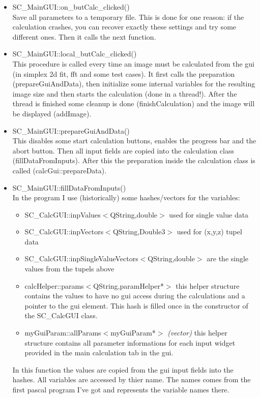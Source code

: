\documentclass[11pt]{article} %
\begin{document}
\begin{itemize}
\item SC\_MainGUI::on\_butCalc\_clicked() \\
	Save all parameters to a temporary file. This is done for one reason: if the calculation crashes, you can recover exactly these settings and try some different ones. Then it calls the next function.

\item SC\_MainGUI::local\_butCalc\_clicked() \\
	This procedure is called every time an image must be calculated from the gui (in simplex 2d fit, fft and some test cases). It first calls the preparation (prepareGuiAndData), then initialize some internal variables for the resulting image size and then starts the calculation (done in a thread!). After the thread is finished some cleanup is done (finishCalculation) and the image will be displayed (addImage).

\item SC\_MainGUI::prepareGuiAndData() \\
	This disables some start calculation buttons, enables the progress bar and the abort button. Then all input fields are copied into the calculation class (fillDataFromInputs). After this the preparation inside the calculation class is called (calcGui::prepareData).

\item SC\_MainGUI::fillDataFromInputs() \\
	In the program I use (historically) some hashes/vectors for the variables:
	\begin{itemize}\itemsep0pt
	\item SC\_CalcGUI::inpValues$<$QString,double$>$ used for single value data
	\item SC\_CalcGUI::inpVectors$<$QString,Double3$>$ used for (x,y,z) tupel data
	\item SC\_CalcGUI::inpSingleValueVectors$<$QString,double$>$ are the single values from the tupels above
	\item calcHelper::params$<$QString,paramHelper*$>$ this helper structure contains the values to have no gui access during the calculations and a pointer to the gui element. This hash is filled once in the constructor of the SC\_CalcGUI class.
	\item myGuiParam::allParams$<$myGuiParam*$>$ {\it (vector)} this helper structure contains all parameter informations for each input widget provided in the main calculation tab in the gui.
	\end{itemize}
In this function the values are copied from the gui input fields into the hashes. All variables are accessed by thier name. The names comes from the first pascal program I've got and represents the variable names there.


\end{itemize}
\end{document}
